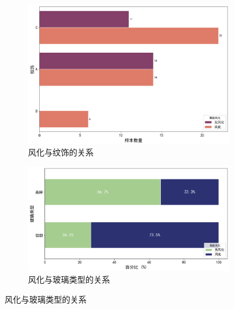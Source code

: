 \begin{figure}[H]
	\centering
	\begin{subfigure}[b]{0.49\textwidth}
		\centering
		\includegraphics[width=\textwidth]{figs/3问题一/风化与纹饰的关系.png}
		\caption{风化与纹饰的关系}
		\label{fig:relation_pattern}
	\end{subfigure}
	\hfill %
	\begin{subfigure}[b]{0.49\textwidth}
		\centering
		\includegraphics[width=\textwidth]{figs/3问题一/风化与玻璃类型的关系.png}
		\caption{风化与玻璃类型的关系}
		\label{fig:relation_type}
	\end{subfigure}

	\vspace{0.5cm} %


\end{figure}

